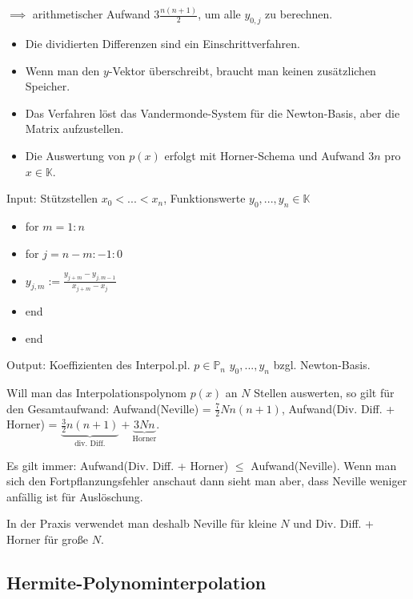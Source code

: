 $\implies$ arithmetischer Aufwand $3 \frac{n(n+1)}{2}$, um alle $y_{0,j}$ zu berechnen.

\begin{remark}
	\begin{itemize}
		\item Die dividierten Differenzen sind ein Einschrittverfahren.
		\item Wenn man den $y$-Vektor überschreibt, braucht man keinen zusätzlichen Speicher.
		\item Das Verfahren löst das Vandermonde-System für die Newton-Basis, aber die Matrix aufzustellen.
		\item Die Auswertung von $p(x)$ erfolgt mit Horner-Schema und Aufwand $3n$ pro $x \in \mathbb{K}$.
	\end{itemize}
\end{remark}

\begin{algorithm}
	Input: Stützstellen $x_0 < ... < x_n$, Funktionswerte $y_0, ..., y_n \in \mathbb{K}$
	
	\begin{itemize}
		\item for $m=1:n$
		\item for $j = n-m:-1:0$
		\item $y_{j,m} := \frac{y_{j+m} - y_{j,m-1}}{x_{j+m} - x_j}$
		\item end
		\item end
	\end{itemize}
	
	Output: Koeffizienten des Interpol.pl. $p \in \mathbb{P}_n$ $y_0, ..., y_n$ bzgl. Newton-Basis.
\end{algorithm}

\begin{remark}
	Will man das Interpolationspolynom $p(x)$ an $N$ Stellen auswerten, so gilt für den Gesamtaufwand: Aufwand(Neville) = $\frac{7}{2}Nn(n+1)$, Aufwand(Div. Diff. + Horner) = $\underbrace{\frac{3}{2}n(n+1)}_{\text{div. Diff.}} + \underbrace{3Nn}_{\text{Horner}}$.
	
	Es gilt immer: Aufwand(Div. Diff. + Horner) $\leq$ Aufwand(Neville). Wenn man sich den Fortpflanzungsfehler anschaut dann sieht man aber, dass Neville weniger anfällig ist für Auslöschung.
	
	In der Praxis verwendet man deshalb Neville für kleine $N$ und Div. Diff. + Horner für große $N$.
\end{remark}

\subsection{Hermite-Polynominterpolation}

